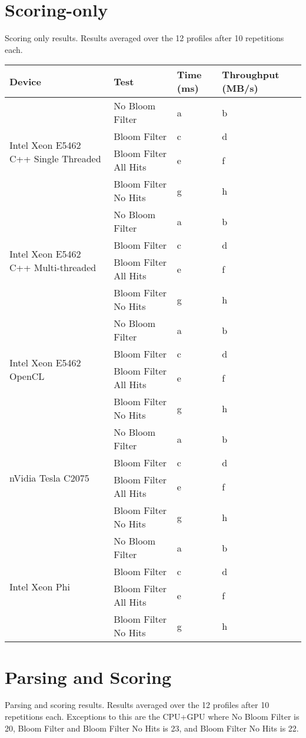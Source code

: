 \section{Scoring-only}

Scoring only results. Results averaged over the 12 profiles after 10 repetitions
each.

\begin{tabular}{|l|l|l|l|}
\hline
Device & Test & Time (ms) & Throughput (MB/s)\\
\hline
\multirow{4}{*}{Intel Xeon E5462 C++ Single Threaded}
& No Bloom Filter & a & b \\
& Bloom Filter & c & d \\
& Bloom Filter All Hits & e & f \\
& Bloom Filter No Hits & g & h \\
\hline
\multirow{4}{*}{Intel Xeon E5462 C++ Multi-threaded}
& No Bloom Filter & a & b \\
& Bloom Filter & c & d \\
& Bloom Filter All Hits & e & f \\
& Bloom Filter No Hits & g & h \\
\hline
\multirow{4}{*}{Intel Xeon E5462 OpenCL}
& No Bloom Filter & a & b \\
& Bloom Filter & c & d \\
& Bloom Filter All Hits & e & f \\
& Bloom Filter No Hits & g & h \\
\hline
\multirow{4}{*}{nVidia Tesla C2075}
& No Bloom Filter & a & b \\
& Bloom Filter & c & d \\
& Bloom Filter All Hits & e & f \\
& Bloom Filter No Hits & g & h \\
\hline
\multirow{4}{*}{Intel Xeon Phi}
& No Bloom Filter & a & b \\
& Bloom Filter & c & d \\
& Bloom Filter All Hits & e & f \\
& Bloom Filter No Hits & g & h \\
\hline
\end{tabular}

\section{Parsing and Scoring}

Parsing and scoring results. Results averaged over the 12 profiles after 10
repetitions each. Exceptions to this are the CPU+GPU where No Bloom Filter is
20, Bloom Filter and Bloom Filter No Hits is 23, and Bloom Filter No Hits is 22.

